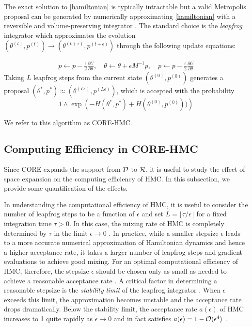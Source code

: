 \documentclass[10pt,fleqn]{article} \pdfoutput=1
\DeclareMathOperator{\1}{\mathbbm{1}} \DeclareMathOperator{\bigO}{\mc O}
\newcommand{\dt}{\epsilon} %
\newcommand{\mass}{M} %
\begin{document}
The exact solution to \eqref{hamiltonian} is typically intractable but a
valid Metropolis proposal can be generated by numerically approximating
\eqref{hamiltonian} with a reversible and volume-preserving  integrator
\citep{neal2011mcmc}. The standard choice is the \textit{leapfrog}
integrator which approximates the evolution $(\theta^{(t)},p^{(t)}) \to (\theta^{(t +
			\dt)},p^{(t + \dt)})$ through the following update equations:

\begin{equation} \begin{aligned} \label{leap-frog} 
p \leftarrow p -
		\frac{\dt}{2} \frac{\partial U}{\partial  \theta },\quad \theta \leftarrow  \theta
		+ \dt \mass^{-1}p,\quad p \leftarrow p -  \frac{\dt}{2}
		\frac{\partial U}{\partial  \theta }\end{aligned} \end{equation} Taking
$L$ leapfrog steps from the current state $(\theta^{(0)},p^{(0)})$
generates a proposal $(\theta^{*},p^{*}) \approx (\theta^{(L \dt)},p^{(L
	\dt)})$, which is accepted with the probability $$1\wedge \exp
	\left( - H(\theta^{*},p^{*}) + H(\theta^{(0)},p^{(0)}))\right)$$

We refer to this algorithm as CORE-HMC.

\subsection{Computing Efficiency in CORE-HMC}

Since CORE expands the support from $\mathcal{D}$ to $\mathcal{R}$, it is useful to
study the effect of space expansion on the computing efficiency of HMC. In this
subsection, we provide some  quantification of the effects.


In understanding the computational efficiency of HMC, it is useful to
consider the number of leapfrog steps to be a function of $\dt$ and set $L
	= \lfloor \tau / \dt \rfloor$ for a fixed integration time $\tau > 0$. In
this case, the mixing rate of HMC is completely determined by $\tau$ in the
limit $\dt \to 0$ \citep{betancourt17}. In practice, while a smaller
stepsize $\dt$ leads to a more accurate numerical approximation of
Hamiltonian dynamics and hence a higher acceptance rate, it takes a larger
number of leapfrog steps and gradient evaluations to achieve good mixing.
For an optimal computational efficiency of HMC, therefore, the stepsize
$\dt$ should be chosen only as small as needed to achieve a reasonable
acceptance rate \citep{beskos13, betancourt14}. A critical factor in
determining a reasonable stepsize is the \textit{stability limit} of the
leapfrog integrator \citep{neal2011mcmc}. When $\dt$ exceeds this limit,
the approximation becomes unstable and the acceptance rate drops
dramatically. Below the stability limit, the acceptance rate $a(\dt)$ of
HMC increases to 1 quite rapidly as $\dt \to 0$ and in fact satisfies
$a(\dt) = 1 - \mc O(\dt^4)$ \citep{beskos13}.
\end{document}
